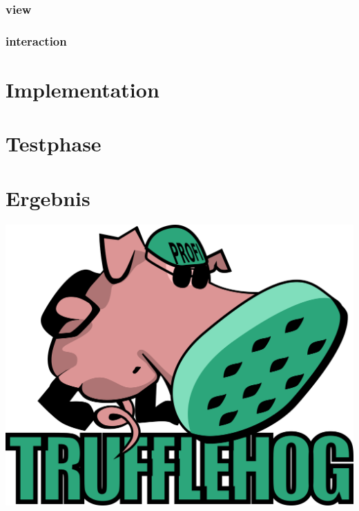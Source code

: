 \documentclass[18pt]{beamer}
\begin{document}
	\subsubsection{view}
		
	\subsubsection{interaction}
		

\section{Implementation}

\section{Testphase}
\section{Ergebnis}
    
    

\begin{frame}
	\centering
	\includegraphics[width=0.8\linewidth]{images/title}
\end{frame}

\appendix
\beginbackup


\backupend
\end{document}
